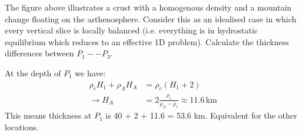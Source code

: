 The figure above illustrates a crust with a homogenous density and a mountain change floating on the asthenosphere. Consider this as an idealised case in which every vertical slice is locally balanced (i.e. everything is in hydrostatic equilibrium which reduces to an effective 1D problem). Calculate the thickness differences between $P_1 -- P_3$.


\ifanswers
  \begin{tcolorbox}[enhanced jigsaw,breakable,pad at break*=1mm,
    colback=blue!5!white,colframe=babyblueeyes,title=Solutions]
At the depth of $P_1$ we have:
\begin{align*}
\rho_c H_1 + \rho_A H_A &= \rho_c (H_1 + 2) \\
\rightarrow H_A &= 2 \frac{\rho_c}{\rho_A -\rho_c} \approx 11.6 \, \text{km}
\end{align*}
This means thickness at $P_1$ is 40 + 2 + 11.6 = 53.6 km. Equivalent for the other locations.
\end{tcolorbox}
\fi

